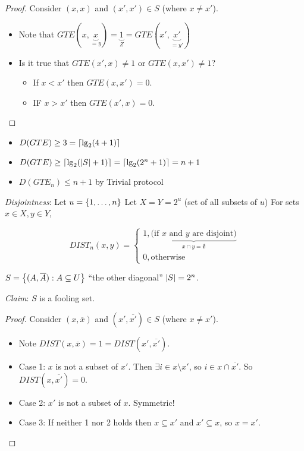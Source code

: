 \begin{proof}
    Consider $(x, x)$ and $(x', x') \in S$ (where $x \neq x'$).

    \begin{itemize}
        \item Note that $GTE(x, \underbrace{x}_{= y}) = \underbrace{1}_{Z} = GTE(x', \underbrace{x'}_{= y'})$
        \item Is it true that $GTE(x', x) \neq 1$ or $GTE(x, x') \neq 1$?

        \begin{itemize}
            \item If $x < x'$ then $GTE(x, x') = 0$.
            \item IF $x > x'$ then $GTE(x', x) = 0$.
        \end{itemize}
    \end{itemize}
\end{proof}

\begin{corollary}
    \begin{itemize}
        \item $D(GTE) \geq 3 = \left \lceil \lg_2(4 + 1) \right \rceil$
        \item $D(GTE) \geq \left \lceil \lg_2(\left | S \right | + 1) \right \rceil = \left \lceil \lg_2(2^n + 1) \right \rceil = n + 1$
        \item $D(GTE_n) \leq n + 1$ by Trivial protocol
    \end{itemize}
\end{corollary}

\emph{Disjointness}: Let $u = \left \{ 1, \ldots, n \right \}$ Let $X = Y = 2^u$ (set of all subsets of $u$) For sets $x \in X, y \in Y$,

\begin{dmath*}
    DIST_n(x, y) =
    \begin{cases}
        1, \underbrace{\text{(if $x$ and $y$ are disjoint)}}_{x \cap y = \emptyset} \\
        0, \text{otherwise}
    \end{cases}
\end{dmath*}

$S = \left \{ (A, \overline{A}): A \subseteq U \right \}$ ``the other diagonal'' $\left | S \right | = 2^n$.

\emph{Claim}: $S$ is a fooling set.

\begin{proof}
    Consider $(x, \overline{x})$ and $(x', \overline{x'}) \in S$ (where $x \neq x'$).

    \begin{itemize}
        \item Note $DIST(x, \overline{x}) = 1 = DIST(x', \overline{x'})$.
        \item Case 1: $x$ is not a subset of $x'$. Then $\exists i \in x \setminus x'$, so $i \in x \cap \overline{x'}$. So $DIST(x, \overline{x'}) = 0$.
        \item Case 2: $x'$ is not a subset of $x$. Symmetric!
        \item Case 3: If neither 1 nor 2 holds then $x \subseteq x'$ and $x' \subseteq x$, so $x = x'$.
    \end{itemize}
\end{proof}

